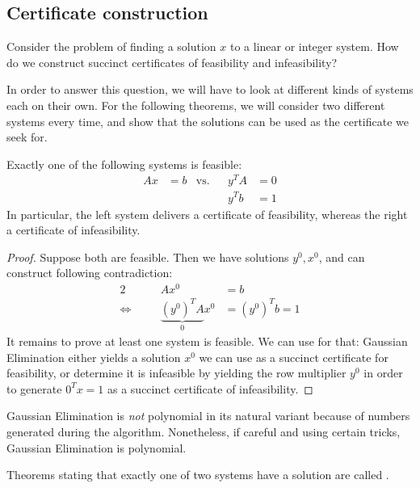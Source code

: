 \subsection{Certificate construction}
\begin{question}
    Consider the problem of finding a solution $x$ to a linear or integer system.
    How do we construct succinct certificates of feasibility and infeasibility?
\end{question}
In order to answer this question, we will have to look at different kinds of systems each on their own.
For the following theorems, we will consider two different systems every time, and show that the solutions
can be used as the certificate we seek for.
\begin{theorem}
    Exactly one of the following systems is feasible:
    \begin{align*}
        Ax & =b & \text{vs.} &  & y^TA & =0 \\
           &    &            &  & y^Tb & =1
    \end{align*}
    In particular, the left system delivers a certificate of feasibility, whereas the right a certificate of infeasibility.
\end{theorem}
\begin{proof}
    Suppose both are feasible. Then we have solutions $y^0,x^0$, and can construct following contradiction:
    \begin{alignat*}{2}
                              &  & Ax^0                        & = b            \\
        \Leftrightarrow \quad &  & \underbrace{(y^0)^TA}_0 x^0 & = (y^0)^Tb = 1
    \end{alignat*}
    It remains to prove at least one system is feasible. We can use  for that:
    Gaussian Elimination either yields a solution $x^0$ we can use as a succinct certificate for feasibility,
    or determine it is infeasible by yielding the row multiplier $y^0$ in order to generate $0^Tx=1$ as a succinct certificate of infeasibility.
\end{proof}
\begin{warning}
    Gaussian Elimination is \emph{not} polynomial in its natural variant because of numbers generated during the algorithm.
    Nonetheless, if careful and using certain tricks, Gaussian Elimination is polynomial.
\end{warning}
\begin{remark}
    Theorems stating that exactly one of two systems have a solution are called .
\end{remark}
